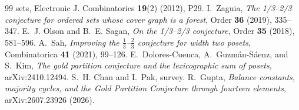 \documentclass[11pt]{article}
\theoremstyle{definition}
\theoremstyle{remark}
\begin{document}
\begin{thebibliography}{99}
{sets}, Electronic J. Combinatorics \textbf{19}(2) (2012), P29.
 I.~Zaguia, \emph{The 1/3--2/3 conjecture for ordered sets whose
cover graph is a forest}, Order \textbf{36} (2019), 335--347.
 E.~J. Olson and B.~E. Sagan, \emph{On the 1/3--2/3 conjecture},
Order \textbf{35} (2018), 581--596.
 A.~Sah, \emph{Improving the $\frac13$--$\frac23$ conjecture for width two
posets}, Combinatorica \textbf{41} (2021), 99--126.
 E.~Dolores-Cuenca, A.~Guzm\'an-S\'aenz, and S.~Kim, \emph{The
gold partition conjecture and the lexicographic sum of posets}, arXiv:2410.12494.
 S.~H. Chan and I.~Pak, survey. %
 R.~Gupta, \emph{Balance constants, majority cycles, and the Gold
Partition Conjecture through fourteen elements}, arXiv:2607.23926 (2026).
\end{thebibliography}
\end{document}
